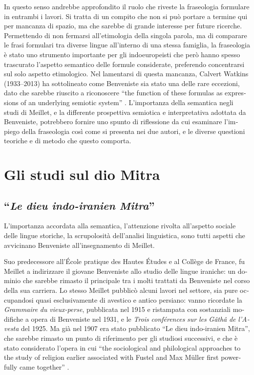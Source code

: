 \documentclass[french,output=paper,colorlinks,citecolor=brown]{../langscibook}
\begin{document}
\begin{otherlanguage}{italian}
In questo senso andrebbe approfondito il ruolo che riveste la fraseologia formulare in entrambi i lavori. Si tratta di un compito che non si può portare a termine qui per mancanza di spazio, ma che sarebbe di grande interesse per future ricerche.
Permettendo di non fermarsi all’etimologia della singola parola, ma di comparare le frasi formulari tra diverse lingue all’interno di una stessa famiglia, la fraseologia è stato uno strumento importante per gli indoeuropeisti che però hanno spesso trascurato l’aspetto semantico delle formule considerate, preferendo concentrarsi sul solo aspetto etimologico.  Nel lamentarsi di questa mancanza, Calvert Watkins (1933--2013) ha sottolineato come Benveniste sia stato una delle rare eccezioni, dato che sarebbe riuscito a riconoscere “the function of these formulas as expressions of an underlying semiotic system” \citep[43]{Watkins1995}. L’importanza della semantica negli studi di Meillet, e la differente prospettiva semiotica e interpretativa adottata da Benveniste, potrebbero fornire uno spunto di riflessione da cui esaminare l’impiego della fraseologia così come si presenta nei due autori, e le diverse questioni teoriche e di metodo che questo comporta.

\section{Gli studi sul dio Mitra}

\subsection{“\textit{Le dieu indo-iranien Mitra}”}

L’importanza accordata alla semantica, l’attenzione rivolta all’aspetto sociale delle lingue storiche, la scrupolosità dell’analisi linguistica, sono tutti aspetti che avvicinano Benveniste all’insegnamento di Meillet.

Suo predecessore all’École pratique des Hautes Études e al Collège de France, fu Meillet a indirizzare il giovane Benveniste allo studio delle lingue iraniche: un dominio che sarebbe rimasto il principale tra i molti trattati da Benveniste nel corso della sua carriera. Lo stesso Meillet pubblicò alcuni lavori nel settore, sia pure occupandosi quasi esclusivamente di avestico e antico persiano: vanno ricordate la \textit{Grammaire} \textit{du} \textit{vieux{}-perse}, pubblicata nel 1915 e ristampata con sostanziali modifiche a opera di Benveniste nel 1931, e le \textit{Trois} \textit{conférences} \textit{sur} \textit{les} \textit{Gâthâ} \textit{de} \textit{l’Avesta} del 1925. Ma già nel 1907 era stato pubblicato “Le dieu indo-iranien Mitra”, che sarebbe rimasto un punto di riferimento per gli studiosi successivi, e che è stato considerato l’opera in cui “the sociological and philological approaches to the study of religion earlier associated with Fustel and Max Müller first powerfully came together” \citep[13]{Lincoln2012}.


\end{otherlanguage}
\end{document}
